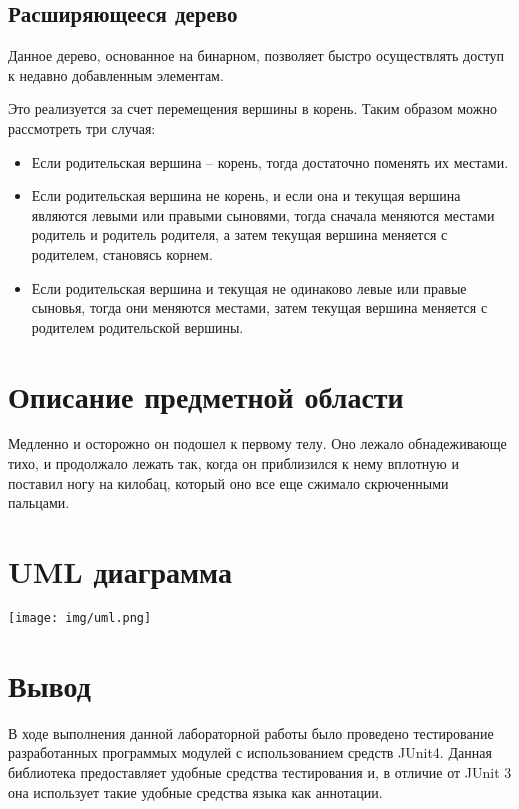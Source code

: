 \subsection{Расширяющееся дерево}
Данное дерево, основанное на бинарном, позволяет быстро осуществлять доступ
к недавно добавленным элементам.

Это реализуется за счет перемещения вершины в корень.
Таким образом можно рассмотреть три случая:
\begin{itemize}
\item Если родительская вершина -- корень, тогда достаточно поменять их местами.
\item Если родительская вершина не корень, и если она и текущая вершина являются
левыми или правыми сыновями, тогда сначала меняются местами родитель и родитель
родителя, а затем текущая вершина меняется с родителем, становясь корнем.
\item Если родительская вершина и текущая не одинаково левые или правые сыновья,
тогда они меняются местами, затем текущая вершина меняется с родителем родительской
вершины.

\end{itemize}
\section{Описание предметной области}
Медленно и осторожно он подошел к первому телу. Оно лежало обнадеживающе тихо,
и продолжало лежать так, когда он приблизился к нему вплотную и поставил ногу
на килобац, который оно все еще сжимало скрюченными пальцами.
\section{UML диаграмма}
\texttt{[image: img/uml.png]}
\section{Вывод}
В ходе выполнения данной лабораторной работы было проведено тестирование
разработанных программых модулей с использованием средств JUnit4. Данная библиотека
предоставляет удобные средства тестирования и, в отличие от JUnit 3 она использует
такие удобные средства языка как аннотации.


